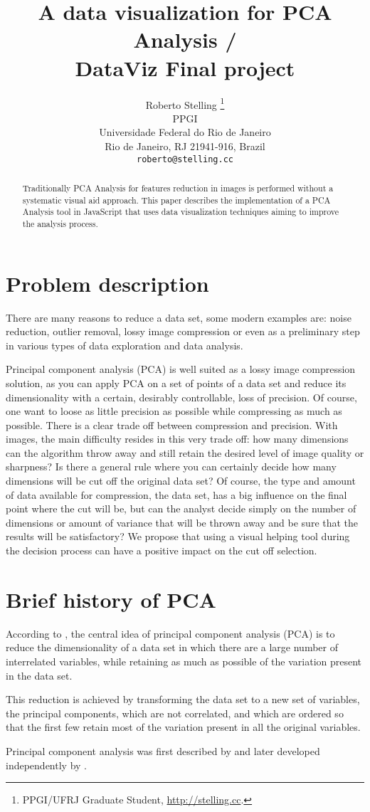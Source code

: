 \documentclass{article} %
\title{A data visualization for PCA Analysis / \\ DataViz Final project}
\author{Roberto Stelling \thanks{ PPGI/UFRJ Graduate Student, \href{http://stelling.cc}{http://stelling.cc}.} \\
PPGI\\
Universidade Federal do Rio de Janeiro\\
Rio de Janeiro, RJ 21941-916, Brazil \\
\texttt{roberto@stelling.cc}
}
\begin{document}
\maketitle

\begin{abstract}
Traditionally PCA Analysis for features reduction in images is performed without a systematic visual aid approach. This paper describes the implementation of a PCA Analysis tool in JavaScript that uses data visualization techniques aiming to improve the analysis process.
\end{abstract}

\section{Problem description}
There are many reasons to reduce a data set, some modern examples are: noise reduction, outlier removal, lossy image compression or even as a preliminary step in various types of data exploration and data analysis.\par
Principal component analysis (PCA) is well suited as a lossy image compression solution, as you can apply PCA on a set of points of a data set and reduce its dimensionality with a certain, desirably controllable, loss of precision. Of course, one want to loose as little precision as possible while compressing as much as possible. There is a clear trade off between compression and precision. With images, the main difficulty resides in this very trade off: how many dimensions can the algorithm throw away and still retain the desired level of image quality or sharpness? Is there a general rule where you can certainly decide how many dimensions will be cut off the original data set? Of course, the type and amount of data available for compression, the data set, has a big influence on the final point where the cut will be, but can the analyst decide simply on the number of dimensions or amount of variance that will be thrown away and be sure that the results will be satisfactory? We propose that using a visual helping tool during the decision process can have a positive impact on the cut off selection.

\section{Brief history of PCA}
According to \citet{jolliffe1986principal}, the central idea of principal component analysis (PCA) is to reduce the dimensionality of a data set in which there are a large number of interrelated variables, while retaining as much as possible of the variation present in the data set.\par
This reduction is achieved by transforming the data set to a new set of variables, the principal components, which are not correlated, and which are ordered so that the first few retain most of the variation present in all the original variables.\par Principal component analysis was first described by \citet{pearson1901principal} and later developed independently by \citet{hotelling1933analysis} \citep{jolliffe1986principal}.\par
\end{document}
